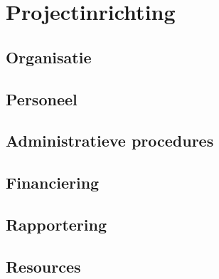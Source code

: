 \section{Projectinrichting}
\subsection{Organisatie}
\subsection{Personeel}
\subsection{Administratieve procedures}
\subsection{Financiering}
\subsection{Rapportering}
\subsection{Resources}
